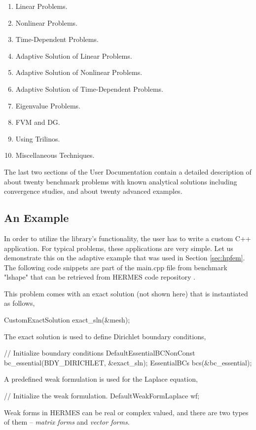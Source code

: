 \documentclass[final,3p,times,twocolumn]{elsarticle}
\begin{document}
\begin{enumerate}
\item Linear Problems.
\item Nonlinear Problems.
\item Time-Dependent Problems.
\item Adaptive Solution of Linear Problems.
\item Adaptive Solution of Nonlinear Problems.
\item Adaptive Solution of Time-Dependent Problems.
\item Eigenvalue Problems.
\item FVM and DG.
\item Using Trilinos.
\item Miscellaneous Techniques.
\end{enumerate}
The last two sections of the User Documentation contain 
a detailed description of about twenty benchmark problems
with known analytical solutions including convergence studies, 
and about twenty advanced examples. 

\subsection{An Example}

In order to utilize the library's functionality, the user has 
to write a custom C++ application. For typical problems, these 
applications are very simple. Let us demonstrate this on 
the adaptive example that was used in Section \ref{sec:hpfem}.
The following code snippets are part of the main.cpp file 
from benchmark "lshape" that can be retrieved from HERMES
code repository \cite{hermes-repo}. 

This problem comes with an exact solution (not shown here)
that is instantiated as follows,

\begin{code}
  CustomExactSolution exact_sln(&mesh);
\end{code}
The exact solution is used to define Dirichlet 
boundary conditions,

\begin{code}
  // Initialize boundary conditions
  DefaultEssentialBCNonConst 
    bc_essential(BDY_DIRICHLET, &exact_sln);
  EssentialBCs bcs(&bc_essential);
\end{code}
A predefined weak formulation is used for the Laplace equation,

\begin{code}
  // Initialize the weak formulation.
  DefaultWeakFormLaplace wf;
\end{code}
Weak forms in HERMES can be real or complex valued,
and there are two types of them -- {\em matrix forms} and
{\em vector forms}. 
\end{document}
